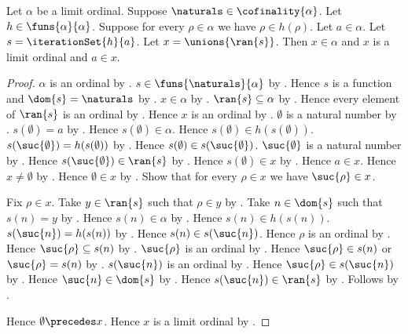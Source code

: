 \begin{proposition}\label{strict_ordinal_iteration_limit}
    Let $\alpha$ be a limit ordinal.
    Suppose $\naturals\in\cofinality{\alpha}$.
    Let $h\in\funs{\alpha}{\alpha}$.
    Suppose for every $\rho\in\alpha$ we have $\rho\in h(\rho)$.
    Let $a\in\alpha$.
    Let $s=\iterationSet{h}{a}$.
    Let $x=\unions{\ran{s}}$.
    Then $x\in\alpha$ and $x$ is a limit ordinal and $a\in x$.
\end{proposition}
\begin{proof}
    $\alpha$ is an ordinal by .
    $s\in\funs{\naturals}{\alpha}$
        by .
    Hence $s$ is a function and $\dom{s}=\naturals$
        by .
    $x\in\alpha$ by .
    $\ran{s}\subseteq\alpha$ by .
    Hence every element of $\ran{s}$ is an ordinal
        by .
    Hence $x$ is an ordinal by .
    $\emptyset$ is a natural number by .
    $s(\emptyset)=a$ by .
    Hence $s(\emptyset)\in\alpha$.
    Hence $s(\emptyset)\in h(s(\emptyset))$.
    $s(\suc{\emptyset})=h(s(\emptyset))$
        by .
    Hence $s(\emptyset)\in s(\suc{\emptyset})$.
    $\suc{\emptyset}$ is a natural number by .
    Hence $s(\suc{\emptyset})\in\ran{s}$ by .
    Hence $s(\emptyset)\in x$ by .
    Hence $a\in x$.
    Hence $x\neq\emptyset$ by .
    Hence $\emptyset\in x$
        by .
    Show that for every $\rho\in x$ we have $\suc{\rho}\in x$.
    \begin{subproof}
        Fix $\rho\in x$.
        Take $y\in\ran{s}$ such that $\rho\in y$
            by .
        Take $n\in\dom{s}$ such that $s(n)=y$
            by .
        Hence $s(n)\in\alpha$ by .
        Hence $s(n)\in h(s(n))$.
        $s(\suc{n})=h(s(n))$
            by .
        Hence $s(n)\in s(\suc{n})$.
        Hence $\rho$ is an ordinal by .
        Hence $\suc{\rho}\subseteq s(n)$
            by .
        $\suc{\rho}$ is an ordinal by .
        Hence $\suc{\rho}\in s(n)$ or $\suc{\rho}=s(n)$
            by .
        $s(\suc{n})$ is an ordinal
            by .
        Hence $\suc{\rho}\in s(\suc{n})$
            by .
        Hence $\suc{n}\in\dom{s}$ by .
        Hence $s(\suc{n})\in\ran{s}$ by .
        Follows by .
    \end{subproof}
    Hence $\emptyset\precedes x$.
    Hence $x$ is a limit ordinal by .
\end{proof}

